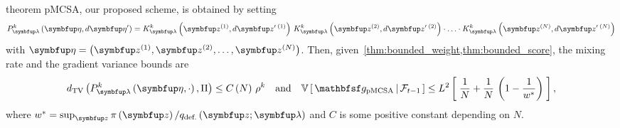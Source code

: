 
\begin{theoremEnd}{theorem}\label{thm:pmcsa}
  pMCSA, our proposed scheme, is obtained by setting
  {%
  \begin{align*}
    P_{\vlambda}^k\left(\veta, d\veta^{\prime}\right)
    = 
    K_{\vlambda}^k\left(\vz^{(1)}, d\vz^{\prime\; (1)}\right)
    \,
    K_{\vlambda}^k\left(\vz^{(2)}, d\vz^{\prime\; (2)}\right)
    \cdot
    \ldots 
    \cdot
    K_{\vlambda}^k\left(\vz^{(N)}, d\vz^{\prime\; (N)}\right)
  \end{align*}
  }
  with \(\veta = \left(\vz^{(1)}, \vz^{(2)}, \ldots, \vz^{(N)}\right)\).
  Then, given~\cref{thm:bounded_weight,thm:bounded_score}, the mixing rate and the gradient variance bounds are
  {%
  \begin{align*}
    \DTV{P_{\vlambda}^k\left(\veta, \cdot\right)}{\Pi}
    \leq
    C\left(N\right)\,{\rho^k}
    \quad\text{and}\quad
    \V{ \rvvg_{\mathrm{pMCSA}} \,\middle|\, \mathcal{F}_{t-1} }
    \leq
    L^2 \left[\; \frac{1}{N} + \frac{1}{N}\,\left(1 - \frac{1}{w^*}\right) \;\right],
  \end{align*}
  }
  where \(w^* = \sup_{\vz} \pi\left(\vz\right) / q_{\text{def.}}\left(\vz;\vlambda\right)\) and \(C\) is some positive constant depending on \(N\).
\end{theoremEnd}
